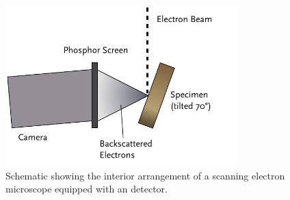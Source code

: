 \begin{figure}
\centering
	\includegraphics[width=0.8\textwidth]{ebsdsetup.pdf}
	\caption[Interior  arrangement for  analysis]{%
	Schematic showing the interior arrangement of a scanning 
	electron microscope equipped with an  detector.}
	\label{fig:ebsdsetup}
\end{figure}

